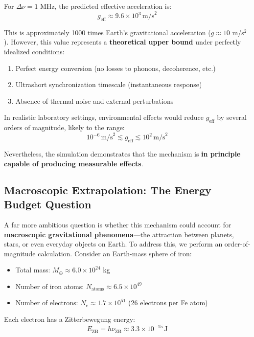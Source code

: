 \documentclass[12pt,letterpaper]{article}
\begin{document}
For $\Delta\nu = 1$ MHz, the predicted effective acceleration is:
\begin{equation}
g_\text{eff} \approx 9.6 \times 10^3 \, \text{m/s}^2
\end{equation}

This is approximately 1000 times Earth's gravitational acceleration ($g \approx 10$ m/s$^2$). However, this value represents a \textbf{theoretical upper bound} under perfectly idealized conditions:
\begin{enumerate}
\item Perfect energy conversion (no losses to phonons, decoherence, etc.)
\item Ultrashort synchronization timescale (instantaneous response)
\item Absence of thermal noise and external perturbations
\end{enumerate}

In realistic laboratory settings, environmental effects would reduce $g_\text{eff}$ by several orders of magnitude, likely to the range:
\begin{equation}
10^{-6} \, \text{m/s}^2 \lesssim g_\text{eff} \lesssim 10^{2} \, \text{m/s}^2
\end{equation}

Nevertheless, the simulation demonstrates that the mechanism is \textbf{in principle capable of producing measurable effects}.

\subsection{Macroscopic Extrapolation: The Energy Budget Question}
\label{subsec:macroscopic_extrapolation}

A far more ambitious question is whether this mechanism could account for \textbf{macroscopic gravitational phenomena}---the attraction between planets, stars, or even everyday objects on Earth. To address this, we perform an order-of-magnitude calculation. Consider an Earth-mass sphere of iron:
\begin{itemize}
\item Total mass: $M_\oplus \approx 6.0 \times 10^{24}$ kg
\item Number of iron atoms: $N_\text{atoms} \approx 6.5 \times 10^{49}$
\item Number of electrons: $N_e \approx 1.7 \times 10^{51}$ (26 electrons per Fe atom)
\end{itemize}

Each electron has a Zitterbewegung energy:
\begin{equation}
E_\text{ZB} = h \nu_\text{ZB} \approx 3.3 \times 10^{-15} \, \text{J}
\end{equation}
\end{document}
